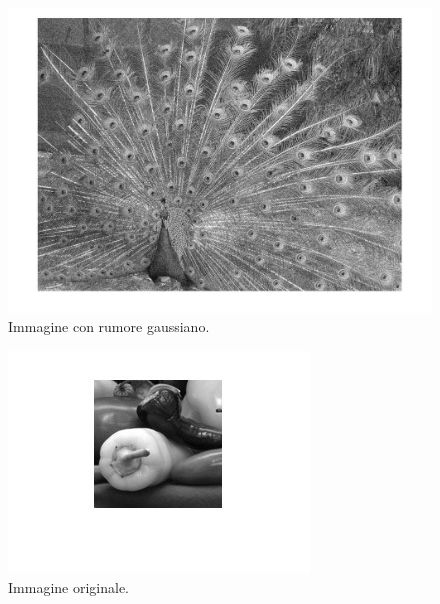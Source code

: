 \documentclass[a4paper]{article}
\begin{document}
	\begin{figure}[!htp]
		\centering
		\includegraphics[width=\textwidth]{img/lab/operato-locali-2.jpg}
		\caption{Immagine con rumore gaussiano.}
	\end{figure}
	\begin{figure}[!htp]
		\centering
		\includegraphics[width=\textwidth]{img/lab/operato-locali-3.jpg}
		\caption{Immagine originale.}
	\end{figure}\newpage
	
\end{document}
